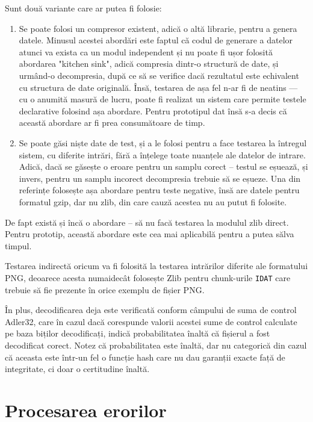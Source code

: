 \documentclass[a4paper,12pt]{report}
\begin{document}
Sunt două variante care ar putea fi folosie:
\begin{enumerate}
    \item
        Se poate folosi un compresor existent, adică o altă librarie, pentru a genera datele.
        Minusul acestei abordări este faptul că codul de generare a datelor atunci va exista
        ca un modul independent și nu poate fi ușor folosită abordarea "kitchen sink", adică
        compresia dintr-o structură de date, și urmând-o decompresia, după ce să se verifice
        dacă rezultatul este echivalent cu structura de date originală.
        Însă, testarea de așa fel n-ar fi de neatins --- cu o anumită masură de lucru,
        poate fi realizat un sistem care permite testele declarative folosind așa abordare.
        Pentru prototipul dat însă s-a decis că această abordare ar fi prea consumătoare de timp.
    \item
        Se poate găsi niște date de test, și a le folosi pentru a face testarea
        la întregul sistem, cu diferite intrări, fără a înțelege toate nuanțele ale datelor de intrare.
        Adică, dacă se găsește o eroare pentru un samplu corect -- testul se eșuează,
        și invers, pentru un samplu incorect decompresia trebuie să se eșueze.
        Una din referințe \cite{gzip_impl} folosește așa abordare pentru teste negative,
        însă are datele pentru formatul gzip, dar nu zlib, din care cauză acestea nu au putut fi folosite.
\end{enumerate}

De fapt există și încă o abordare -- să nu facă testarea la modulul zlib direct.
Pentru prototip, această abordare este cea mai aplicabilă pentru a putea sălva timpul.

Testarea indirectă oricum va fi folosită la testarea intrărilor diferite ale formatului \ac{PNG},
deoarece acesta numaidecât folosește Zlib pentru chunk-urile \texttt{IDAT} care trebuie să fie prezente
în orice exemplu de fișier \ac{PNG}.

În plus, decodificarea deja este verificată conform câmpului de suma de control Adler32,
care în cazul dacă corespunde valorii acestei sume de control calculate pe baza biților decodificați,
indică probabilitatea înaltă că fișierul a fost decodificat corect. 
Notez că probabilitatea este înaltă, dar nu categorică din cazul că aceasta este într-un fel o funcție hash
care nu dau garanții exacte față de integritate, ci doar o certitudine înaltă.


\section{Procesarea erorilor}
\end{document}
